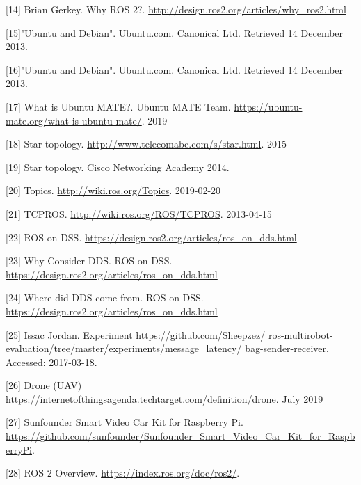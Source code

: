 \documentclass{mproj}
\begin{document}
[14]  Brian Gerkey. Why ROS 2?. \url{http://design.ros2.org/articles/why_ros2.html}

[15]"Ubuntu and Debian". Ubuntu.com. Canonical Ltd. Retrieved 14 December 2013.

[16]"Ubuntu and Debian". Ubuntu.com. Canonical Ltd. Retrieved 14 December 2013.

[17] What is Ubuntu MATE?. Ubuntu MATE Team. \url{https://ubuntu-mate.org/what-is-ubuntu-mate/}. 2019 

[18] Star topology. \url{http://www.telecomabc.com/s/star.html}. 2015

[19] Star topology. Cisco Networking Academy 2014.

[20] Topics. \url{http://wiki.ros.org/Topics}. 2019-02-20

[21] TCPROS. \url{http://wiki.ros.org/ROS/TCPROS}. 2013-04-15 

[22] ROS on DSS. \url{https://design.ros2.org/articles/ros_on_dds.html}

[23] Why Consider DDS. ROS on DSS. \url{https://design.ros2.org/articles/ros_on_dds.html}

[24] Where did DDS come from. ROS on DSS. \url{https://design.ros2.org/articles/ros_on_dds.html}

[25] Issac Jordan. Experiment \url{https://github.com/Sheepzez/ ros-multirobot-evaluation/tree/master/experiments/message_latency/ bag-sender-receiver}. Accessed: 2017-03-18.

[26] Drone (UAV) \url{https://internetofthingsagenda.techtarget.com/definition/drone}. July 2019

[27] Sunfounder Smart Video Car Kit for Raspberry Pi. \url{https://github.com/sunfounder/Sunfounder_Smart_Video_Car_Kit_for_RaspberryPi}.

[28] ROS 2 Overview. \url{https://index.ros.org/doc/ros2/}.
\end{document}
